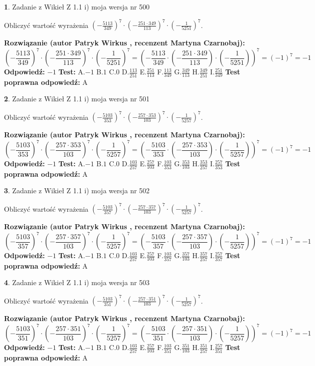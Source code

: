 \documentclass[12pt, a4paper]{article}
\theoremstyle{definition} %
\newtheorem{zad}{}
\newcommand{\zadStart}[1]{\begin{zad}#1\newline}
\newcommand{\zadStop}{\end{zad}}
\newcommand{\rozwStart}[2]{\noindent \textbf{Rozwiązanie (autor #1 , recenzent #2): }\newline}
\newcommand{\rozwStop}{\newline}
\newcommand{\odpStart}{\noindent \textbf{Odpowiedź:}\newline}
\newcommand{\odpStop}{\newline}
\newcommand{\testStart}{\noindent \textbf{Test:}\newline}
\newcommand{\testStop}{\newline}
\newcommand{\kluczStart}{\noindent \textbf{Test poprawna odpowiedź:}\newline}
\newcommand{\kluczStop}{\newline}
\begin{document}
\zadStart{Zadanie z Wikieł Z 1.1 i) moja wersja nr 500}

Obliczyć wartość wyrażenia $(-\frac{5113}{349})^{7} \cdot (-\frac{251 \cdot 349}{113})^{7} \cdot (-\frac{1}{5251})^{7}$.
\zadStop
\rozwStart{Patryk Wirkus}{Martyna Czarnobaj}
$$(-\frac{5113}{349})^{7} \cdot (-\frac{251 \cdot 349}{113})^{7} \cdot (-\frac{1}{5251})^{7} = (-\frac{5113}{349} \cdot (-\frac{251 \cdot 349}{113}) \cdot (-\frac{1}{5251}))^{7} = (-1)^{7} = -1$$
\rozwStop
\odpStart
$-1$
\odpStop
\testStart
A.$-1$ B.$1$ C.$0$ D.$\frac{113}{251}$ E.$\frac{251}{113}$
F.$\frac{113}{349}$ G.$\frac{349}{113}$
H.$\frac{349}{251}$
I.$\frac{251}{349}$
\testStop
\kluczStart
A
\kluczStop



\zadStart{Zadanie z Wikieł Z 1.1 i) moja wersja nr 501}

Obliczyć wartość wyrażenia $(-\frac{5103}{353})^{7} \cdot (-\frac{257 \cdot 353}{103})^{7} \cdot (-\frac{1}{5257})^{7}$.
\zadStop
\rozwStart{Patryk Wirkus}{Martyna Czarnobaj}
$$(-\frac{5103}{353})^{7} \cdot (-\frac{257 \cdot 353}{103})^{7} \cdot (-\frac{1}{5257})^{7} = (-\frac{5103}{353} \cdot (-\frac{257 \cdot 353}{103}) \cdot (-\frac{1}{5257}))^{7} = (-1)^{7} = -1$$
\rozwStop
\odpStart
$-1$
\odpStop
\testStart
A.$-1$ B.$1$ C.$0$ D.$\frac{103}{257}$ E.$\frac{257}{103}$
F.$\frac{103}{353}$ G.$\frac{353}{103}$
H.$\frac{353}{257}$
I.$\frac{257}{353}$
\testStop
\kluczStart
A
\kluczStop



\zadStart{Zadanie z Wikieł Z 1.1 i) moja wersja nr 502}

Obliczyć wartość wyrażenia $(-\frac{5103}{357})^{7} \cdot (-\frac{257 \cdot 357}{103})^{7} \cdot (-\frac{1}{5257})^{7}$.
\zadStop
\rozwStart{Patryk Wirkus}{Martyna Czarnobaj}
$$(-\frac{5103}{357})^{7} \cdot (-\frac{257 \cdot 357}{103})^{7} \cdot (-\frac{1}{5257})^{7} = (-\frac{5103}{357} \cdot (-\frac{257 \cdot 357}{103}) \cdot (-\frac{1}{5257}))^{7} = (-1)^{7} = -1$$
\rozwStop
\odpStart
$-1$
\odpStop
\testStart
A.$-1$ B.$1$ C.$0$ D.$\frac{103}{257}$ E.$\frac{257}{103}$
F.$\frac{103}{357}$ G.$\frac{357}{103}$
H.$\frac{357}{257}$
I.$\frac{257}{357}$
\testStop
\kluczStart
A
\kluczStop



\zadStart{Zadanie z Wikieł Z 1.1 i) moja wersja nr 503}

Obliczyć wartość wyrażenia $(-\frac{5103}{351})^{7} \cdot (-\frac{257 \cdot 351}{103})^{7} \cdot (-\frac{1}{5257})^{7}$.
\zadStop
\rozwStart{Patryk Wirkus}{Martyna Czarnobaj}
$$(-\frac{5103}{351})^{7} \cdot (-\frac{257 \cdot 351}{103})^{7} \cdot (-\frac{1}{5257})^{7} = (-\frac{5103}{351} \cdot (-\frac{257 \cdot 351}{103}) \cdot (-\frac{1}{5257}))^{7} = (-1)^{7} = -1$$
\rozwStop
\odpStart
$-1$
\odpStop
\testStart
A.$-1$ B.$1$ C.$0$ D.$\frac{103}{257}$ E.$\frac{257}{103}$
F.$\frac{103}{351}$ G.$\frac{351}{103}$
H.$\frac{351}{257}$
I.$\frac{257}{351}$
\testStop
\kluczStart
A
\kluczStop
\end{document}

